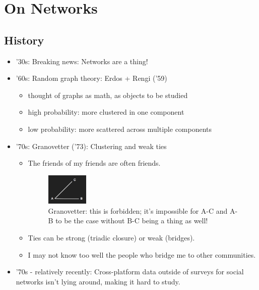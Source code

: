 
\section{On Networks}
\subsection{History}
\begin{itemize}
  \item '30s: Breaking news: Networks are a thing!
  \item '60s: Random graph theory: Erdos + Rengi ('59)
  \begin{itemize}
	\item thought of graphs as math, as objects to be studied
	\item high probability:  more clustered in one component
	\item low probability: more scattered across multiple components
  \end{itemize}
  \item '70s: Granovetter ('73): Clustering and weak ties
  \begin{itemize}
	\item The friends of my friends are often friends.
    \begin{figure}[ht]
    	\begin{center}
      	\includegraphics[width=0.2\textwidth]{figures/Figure_1_Granovetter.png}
      	\caption{
        	Granovetter: this is forbidden; it's impossible for A-C and A-B to be the case without B-C being a thing as well!}
    	\label{fig:figure1}
  		\end{center}
	\end{figure}
	\item Ties can be strong (triadic closure) or weak (bridges).
    \item I may not know too well the people who bridge me to other 		communities.
  \end{itemize}
  \item '70s - relatively recently: Cross-platform data outside of surveys for social networks isn't lying around, making it hard to study.

\end{itemize}
